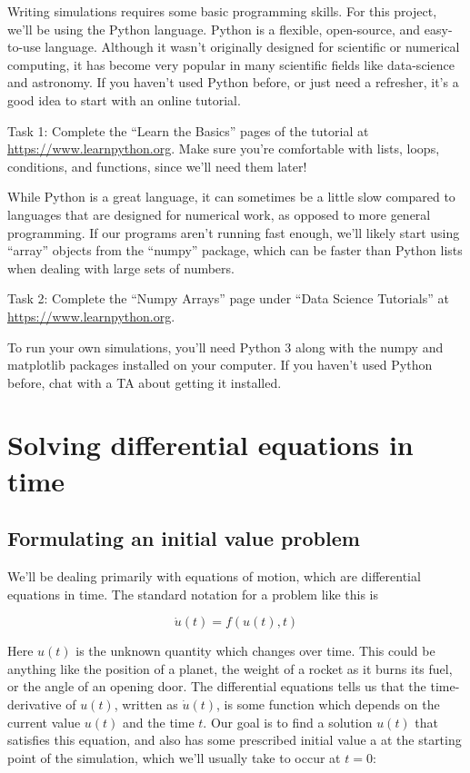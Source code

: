\documentclass[main.tex]{subfiles}
\begin{document}
Writing simulations requires some basic programming skills.
For this project, we'll be using the Python language.
Python is a flexible, open-source, and easy-to-use language.
Although it wasn't originally designed for scientific or numerical computing, it has become very popular in many scientific fields like data-science and astronomy.
If you haven't used Python before, or just need a refresher, it's a good idea to start with an online tutorial.

Task 1:
Complete the ``Learn the Basics'' pages of the tutorial at \url{https://www.learnpython.org}.
Make sure you're comfortable with lists, loops, conditions, and functions, since we'll need them later!

While Python is a great language, it can sometimes be a little slow compared to languages that are designed for numerical work, as opposed to more general programming.
If our programs aren't running fast enough, we'll likely start using ``array'' objects from the ``numpy'' package, which can be faster than Python lists when dealing with large sets of numbers.

Task 2:
Complete the ``Numpy Arrays'' page under ``Data Science Tutorials'' at \url{https://www.learnpython.org}.

To run your own simulations, you'll need Python 3 along with the numpy and matplotlib packages installed on your computer.
If you haven't used Python before, chat with a TA about getting it installed.
\section{Solving differential equations in time}

\subsection{Formulating an initial value problem}

We'll be dealing primarily with equations of motion, which are differential equations in time.
The standard notation for a problem like this is

\begin{equation}
    \dot{u}(t)=f(u(t), t)
\end{equation}

Here $u(t)$ is the unknown quantity which changes over time.
This could be anything like the position of a planet, the weight of a rocket as it burns its fuel, or the angle of an opening door.
The differential equations tells us that the time-derivative of $u(t)$, written as $\dot{u}(t)$, is some function which depends on the current value $u(t)$ and the time $t$.
Our goal is to find a solution $u(t)$ that satisfies this equation, and also has some prescribed initial value a at the starting point of the simulation, which we'll usually take to occur at $t=0$:
\end{document}

